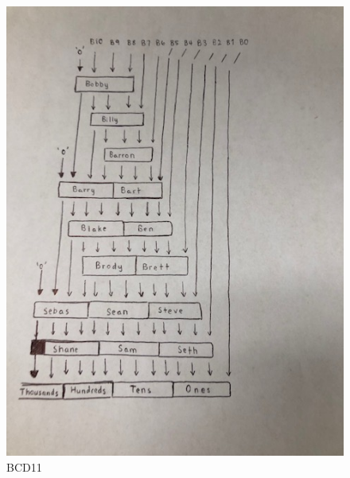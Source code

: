\documentclass[11pt]{article}
\begin{document}
	\begin{figure}[ht]\centering
		
		
		
		\includegraphics[width=1\textwidth,angle=270,origin=c,scale=1]{bcd11.jpg}
		\caption{BCD11}
		\label{fig:sim_with_table}
		
	\end{figure}
	
\end{document}
